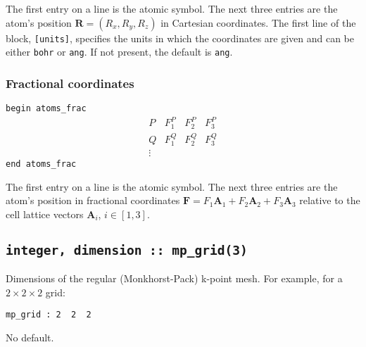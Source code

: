 The first entry on a line is the atomic symbol. The next three entries
are the atom's position $\mathbf{R}=(R_x , R_y, R_z)$ in Cartesian
coordinates. The first line of the block, \verb#[units]#, specifies
the units in which the coordinates are given and can be either
\verb#bohr# or \verb#ang#. If not present, the default is \verb#ang#.

\subsubsection{Fractional coordinates}

\noindent \verb#begin atoms_frac#
$$
\begin{array}{cccc}
P  & F^{P}_{1} & F^{P}_{2} & F^{P}_{3} \\
Q  & F^{Q}_{1} & F^{Q}_{2} & F^{Q}_{3} \\
\vdots
\end{array}
$$
\verb#end atoms_frac#

The first entry on a line is the atomic symbol. The next three entries
are the atom's position in fractional coordinates $\mathbf{F} = F_1
\mathbf{A}_{1} + F_2 \mathbf{A}_{2} + F_3 \mathbf{A}_{3}$
relative to the cell lattice vectors $\mathbf{A}_i$, $i\in [1,3]$. 


\subsection[mp\_grid]{\tt integer, dimension :: mp\_grid(3)}
Dimensions of the regular (Monkhorst-Pack) k-point mesh. For example,
for a $2\times2\times2$ grid:

\verb#mp_grid : 2  2  2#

No default.


%
%
%
%
%

